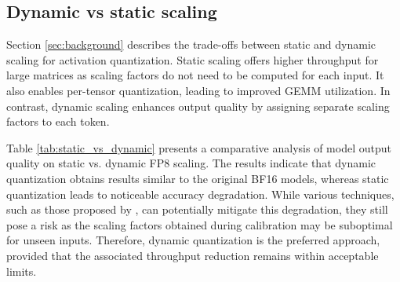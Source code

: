 \subsection{Dynamic vs static scaling}

Section \ref{sec:background} describes the trade-offs between static and dynamic scaling for activation quantization. Static scaling offers higher throughput for large matrices as scaling factors do not need to be computed for each input. It also enables per-tensor quantization, leading to improved GEMM utilization. In contrast, dynamic scaling enhances output quality by assigning separate scaling factors to each token. 



Table  \ref{tab:static_vs_dynamic} presents a comparative analysis of model output quality on static vs. dynamic FP8 scaling. 
The results indicate that dynamic quantization obtains results similar to the original BF16 models, whereas static quantization leads to noticeable accuracy degradation. While various techniques, such as those proposed by \citet{xiao2024smoothquantaccurateefficientposttraining, liu2024spinquant, ashkboos2024quarot}, can potentially mitigate this degradation, they still pose a risk as the scaling factors obtained during calibration may be suboptimal for unseen inputs. Therefore, dynamic quantization is the preferred approach, provided that the associated throughput reduction remains within acceptable limits.


